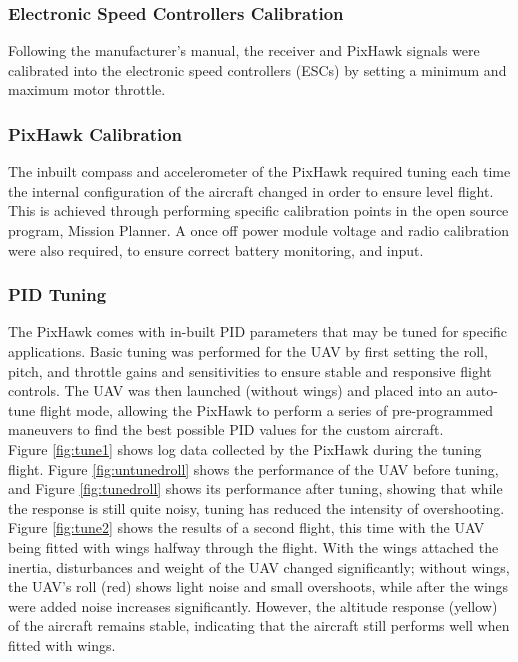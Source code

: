 \subsubsection*{Electronic Speed Controllers Calibration}
Following the manufacturer's manual, the receiver and PixHawk signals were calibrated into the electronic speed controllers (ESCs) by setting a minimum and maximum motor throttle.

\subsubsection*{PixHawk Calibration}
The inbuilt compass and accelerometer of the PixHawk required tuning each time the internal configuration of the aircraft changed in order to ensure level flight. This is achieved through performing specific calibration points in the open source program, Mission Planner. A once off power module voltage and radio calibration were also required, to ensure correct battery monitoring, and input. 

\subsubsection*{PID Tuning}
The PixHawk comes with in-built PID parameters that may be tuned for specific applications. Basic tuning was performed for the UAV by first setting the roll, pitch, and throttle gains and sensitivities to ensure stable and responsive flight controls. The UAV was then launched (without wings) and placed into an auto-tune flight mode, allowing the PixHawk to perform a series of pre-programmed maneuvers to find the best possible PID values for the custom aircraft.\\

Figure \ref{fig:tune1} shows log data collected by the PixHawk during the tuning flight. Figure \ref{fig:untunedroll} shows the performance of the UAV before tuning, and Figure \ref{fig:tunedroll} shows its performance after tuning, showing that while the response is still quite noisy, tuning has reduced the intensity of overshooting. Figure \ref{fig:tune2} shows the results of a second flight, this time with the UAV being fitted with wings halfway through the flight. With the wings attached the inertia, disturbances and weight of the UAV changed significantly; without wings, the UAV's roll (red) shows light noise and small overshoots, while after the wings were added noise increases significantly. However, the altitude response (yellow) of the aircraft remains stable, indicating that the aircraft still performs well when fitted with wings.

